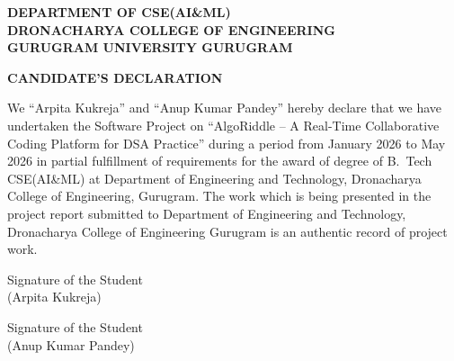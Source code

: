 \documentclass[12pt,a4paper,oneside]{report}
\begin{document}


\setcounter{page}{2}


\clearpage
{}
\begin{center}
\textbf{DEPARTMENT OF CSE(AI\&ML)}\\[0.2cm]
\textbf{DRONACHARYA COLLEGE OF ENGINEERING}\\[0.2cm]
\textbf{GURUGRAM UNIVERSITY GURUGRAM}

\vspace{1.5cm}

\textbf{\Large CANDIDATE'S DECLARATION}
\end{center}

\vspace{0.5cm}

We ``Arpita Kukreja'' and ``Anup Kumar Pandey'' hereby declare that we have undertaken the Software Project on ``AlgoRiddle -- A Real-Time Collaborative Coding Platform for DSA Practice'' during a period from January 2026 to May 2026 in partial fulfillment of requirements for the award of degree of B.~Tech CSE(AI\&ML) at Department of Engineering and Technology, Dronacharya College of Engineering, Gurugram. The work which is being presented in the project report submitted to Department of Engineering and Technology, Dronacharya College of Engineering Gurugram is an authentic record of project work.

\vspace{3cm}

\begin{minipage}[t]{0.45\textwidth}
\raggedright
Signature of the Student\\
(Arpita Kukreja)
\end{minipage}
\hfill
\begin{minipage}[t]{0.45\textwidth}
\raggedleft
Signature of the Student\\
(Anup Kumar Pandey)
\end{minipage}
\end{document}
